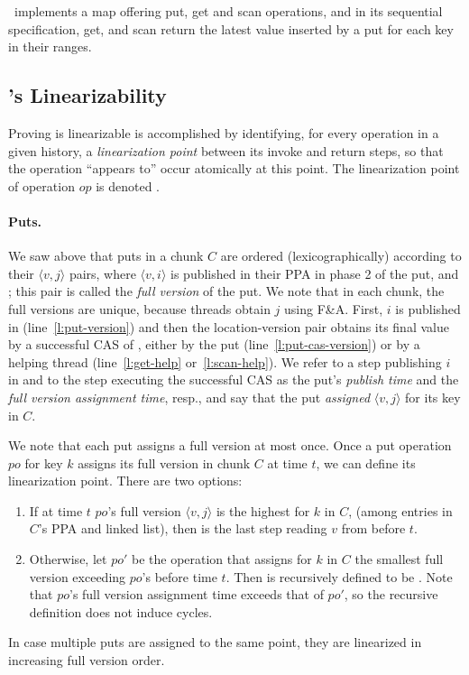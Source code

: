 \kiwi\ implements a map offering put, get and scan operations, and in its sequential specification, get, and scan return the latest value inserted by a put for each key in their ranges.

\subsection{\kiwi's Linearizability}
\label{sec:safe}

Proving {\kiwi} is linearizable is accomplished by identifying, for every operation in a given history, a \emph{linearization point} between its invoke and return steps, so that the operation ``appears to'' occur atomically at this point. 
The linearization point of operation $op$ is denoted . 

\paragraph{Puts.} 

We saw above that puts in a chunk $C$
are ordered (lexicographically) according to their $\langle v, j \rangle$  pairs, where
$\langle v, i \rangle$ is published in their PPA in phase 2 of the put, and ; this pair is called the \emph{full version} of the put.
We note that in each chunk, the full versions are unique, because threads obtain $j$ using F\&A.
First,  $i$ is published in  (line~\ref{l:put-version}) and then
the location-version pair obtains its final value by a successful CAS of , either by the put (line~\ref{l:put-cas-version}) or by a helping thread (line~\ref {l:get-help} or~\ref{l:scan-help}). 
We refer to 
a step publishing $i$ in  and to
the step executing the successful CAS  as the put's \emph{publish time} and the \emph{full version assignment time}, resp., 
and say that the put \emph{assigned}  $\langle v, j \rangle$ for its key in $C$.

We note that each put assigns a full version at most once. 
Once a put operation $po$ for key $k$ assigns its full version in chunk $C$ at time $t$, we can define its linearization point. 
There are two options: 
\begin{enumerate}
\setlength{\itemsep}{0pt}
\setlength{\parskip}{0pt}
\item If at time $t$
$po$'s full version $\langle v, j \rangle$ is the highest for $k$ in $C$, (among entries in $C$'s {PPA} and  linked list),
then   is the last step reading $v$ from  before $t$.
\item  Otherwise, let $po'$ be the 
 operation that assigns for $k$ in $C$ the smallest full version exceeding $po$'s
before time $t$. Then  is recursively defined to be . Note that 
$po$'s full version assignment time exceeds that of  $po'$, so the recursive definition does not induce cycles. 
\end{enumerate}
In case multiple puts are assigned to the same point, they are linearized in increasing full version order.

